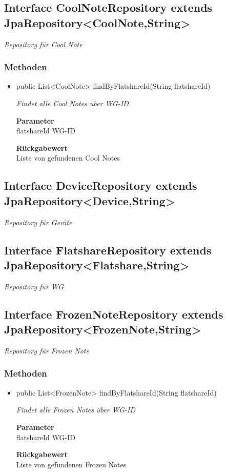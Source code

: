 \documentclass[a4paper]{scrreprt}
\begin{document}
    \subsection{Interface CoolNoteRepository extends JpaRepository<CoolNote,String>}
    \textit{Repository für Cool Note}
    \subsubsection{Methoden}
    \begin{itemize}
    	\item{public List<CoolNote> findByFlatshareId(String flatshareId)}
    	
    	\textit{Findet alle Cool Notes über WG-ID}
    	
    	\textbf{Parameter} \\
    	flatshareId WG-ID
    	
    	\textbf{Rückgabewert} \\
    	Liste von gefundenen Cool Notes
    \end{itemize}
    \subsection{Interface DeviceRepository extends JpaRepository<Device,String>}
    \textit{Repository für Geräte}
    \subsection{Interface FlatshareRepository extends JpaRepository<Flatshare,String>}
    \textit{Repository für WG}
    \subsection{Interface FrozenNoteRepository extends JpaRepository<FrozenNote,String>}
    \textit{Repository für Frozen Note}
    \subsubsection{Methoden}
    \begin{itemize}
    	\item{public List<FrozenNote> findByFlatshareId(String flatshareId)}
    	
    	\textit{Findet alle Frozen Notes über WG-ID}
    	
    	\textbf{Parameter} \\
    	flatshareId WG-ID
    	
    	\textbf{Rückgabewert} \\
    	Liste von gefundenen Frozen Notes
    \end{itemize}
\end{document}

